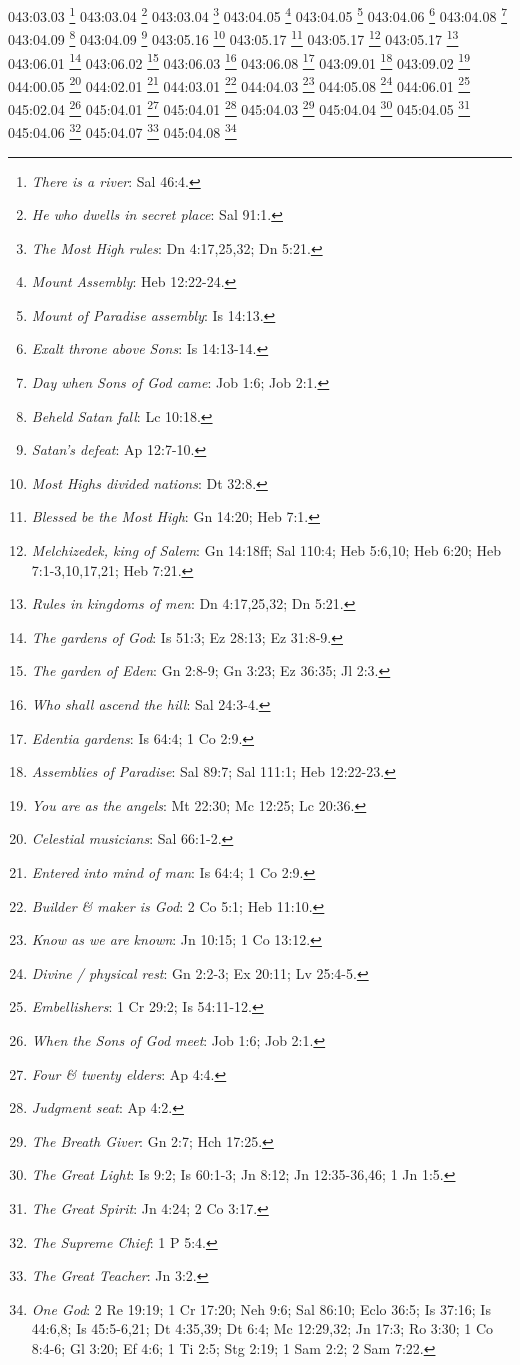 {{{{{{{{{{{{{{{{{{{{{{{043:03.03 \footnote{\textit{There is a river}: Sal 46:4.}
043:03.04 \footnote{\textit{He who dwells in secret place}: Sal 91:1.}
043:03.04 \footnote{\textit{The Most High rules}: Dn 4:17,25,32; Dn 5:21.}
043:04.05 \footnote{\textit{Mount Assembly}: Heb 12:22-24.}
043:04.05 \footnote{\textit{Mount of Paradise assembly}: Is 14:13.}
043:04.06 \footnote{\textit{Exalt throne above Sons}: Is 14:13-14.}
043:04.08 \footnote{\textit{Day when Sons of God came}: Job 1:6; Job 2:1.}
043:04.09 \footnote{\textit{Beheld Satan fall}: Lc 10:18.}
043:04.09 \footnote{\textit{Satan's defeat}: Ap 12:7-10.}
043:05.16 \footnote{\textit{Most Highs divided nations}: Dt 32:8.}
043:05.17 \footnote{\textit{Blessed be the Most High}: Gn 14:20; Heb 7:1.}
043:05.17 \footnote{\textit{Melchizedek, king of Salem}: Gn 14:18ff; Sal 110:4; Heb 5:6,10; Heb 6:20; Heb 7:1-3,10,17,21; Heb 7:21.}
043:05.17 \footnote{\textit{Rules in kingdoms of men}: Dn 4:17,25,32; Dn 5:21.}
043:06.01 \footnote{\textit{The gardens of God}: Is 51:3; Ez 28:13; Ez 31:8-9.}
043:06.02 \footnote{\textit{The garden of Eden}: Gn 2:8-9; Gn 3:23; Ez 36:35; Jl 2:3.}
043:06.03 \footnote{\textit{Who shall ascend the hill}: Sal 24:3-4.}
043:06.08 \footnote{\textit{Edentia gardens}: Is 64:4; 1 Co 2:9.}
043:09.01 \footnote{\textit{Assemblies of Paradise}: Sal 89:7; Sal 111:1; Heb 12:22-23.}
043:09.02 \footnote{\textit{You are as the angels}: Mt 22:30; Mc 12:25; Lc 20:36.}
044:00.05 \footnote{\textit{Celestial musicians}: Sal 66:1-2.}
044:02.01 \footnote{\textit{Entered into mind of man}: Is 64:4; 1 Co 2:9.}
044:03.01 \footnote{\textit{Builder & maker is God}: 2 Co 5:1; Heb 11:10.}
044:04.03 \footnote{\textit{Know as we are known}: Jn 10:15; 1 Co 13:12.}
044:05.08 \footnote{\textit{Divine / physical rest}: Gn 2:2-3; Ex 20:11; Lv 25:4-5.}
044:06.01 \footnote{\textit{Embellishers}: 1 Cr 29:2; Is 54:11-12.}
045:02.04 \footnote{\textit{When the Sons of God meet}: Job 1:6; Job 2:1.}
045:04.01 \footnote{\textit{Four & twenty elders}: Ap 4:4.}
045:04.01 \footnote{\textit{Judgment seat}: Ap 4:2.}
045:04.03 \footnote{\textit{The Breath Giver}: Gn 2:7; Hch 17:25.}
045:04.04 \footnote{\textit{The Great Light}: Is 9:2; Is 60:1-3; Jn 8:12; Jn 12:35-36,46; 1 Jn 1:5.}
045:04.05 \footnote{\textit{The Great Spirit}: Jn 4:24; 2 Co 3:17.}
045:04.06 \footnote{\textit{The Supreme Chief}: 1 P 5:4.}
045:04.07 \footnote{\textit{The Great Teacher}: Jn 3:2.}
045:04.08 \footnote{\textit{One God}: 2 Re 19:19; 1 Cr 17:20; Neh 9:6; Sal 86:10; Eclo 36:5; Is 37:16; Is 44:6,8; Is 45:5-6,21; Dt 4:35,39; Dt 6:4; Mc 12:29,32; Jn 17:3; Ro 3:30; 1 Co 8:4-6; Gl 3:20; Ef 4:6; 1 Ti 2:5; Stg 2:19; 1 Sam 2:2; 2 Sam 7:22.}
}}}}}}}}}}}}}}}}}}}}}}}

